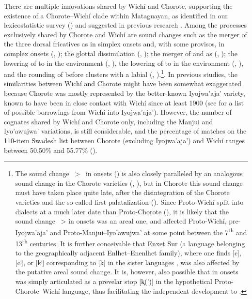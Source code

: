 There are multiple innovations shared by Wichí and Chorote, supporting the existence of a Chorote–Wichí clade within Mataguayan, as identified in our lexicostatistic survey () and suggested in previous research \citep[296]{AF05,LC-VG-07,PVB13a}. Among the processes exclusively shared by Chorote and Wichí are sound changes such as the merger of the three dorsal fricatives as  in simplex onsets and, with some provisos, in complex onsets (, ); the glottal dissimilation (, ); the merger of  and  as  (, ); the lowering of  to  in the environment  (, ), the lowering of  to  in the environment  (, ), and the rounding of  before clusters with a labial (, ).\footnote{The sound change ~>~ in onsets () is also closely paralleled by an analogous sound change in the Chorote varieties (, ), but in Chorote this sound change must have taken place quite late, after the disintegration of the Chorote varieties and the so-called first palatalization (). Since Proto-Wichí split into dialects at a much later date than Proto-Chorote (), it is likely that the sound change ~> in onsets was an areal one, and affected Proto-Wichí, pre-Iyojwa’aja’ and Proto-Manjui–Iyo’awujwa’ at some point between the 7\textsuperscript{th} and 13\textsuperscript{th} centuries. It is further conceivable that Enxet Sur (a language belonging to the geographically adjacent Enlhet–Enenlhet family), where one finds [c], [cʲ], or [kʲ] corresponding to [k] in the sister languages \citep[70–73]{JE21}, was also affected by the putative areal sound change. It is, however, also possible that  in onsets was simply articulated as a prevelar stop [k̟(’)] in the hypothetical Proto-Chorote–Wichí language, thus facilitating the independent development to .}. In previous studies, the similarities between Wichí and Chorote might have been somewhat exaggerated because Chorote was mostly represented by the better-known Iyojwa’aja’ variety, known to have been in close contact with Wichí since at least 1900 (see  for a list of possible borrowings from Wichí into Iyojwa’aja’). However, the number of cognates shared by Wichí and Chorote only, including the Manjui and Iyo’awujwa’ variations, is still considerable, and the percentage of matches on the 110-item Swadesh list between Chorote (excluding Iyojwa’aja’) and Wichí ranges between 50.50\% and 55.77\% ().

